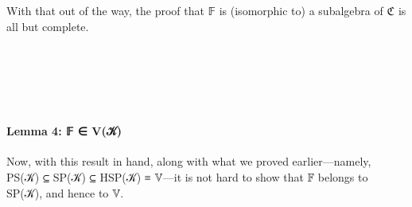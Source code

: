 With that out of the way, the proof that 𝔽 is (isomorphic to) a
subalgebra of ℭ is all but complete.

\begin{code}%
\>[0][@{}l@{\AgdaIndent{1}}]%
\>[1]\AgdaSpace{}%
\AgdaSymbol{:}\AgdaSpace{}%
\AgdaSpace{}%
\AgdaSpace{}%
\AgdaSpace{}%
\AgdaSpace{}%
\AgdaSpace{}%
\AgdaSpace{}%
\AgdaSpace{}%
\<%
\\
%
\>[1]\AgdaSpace{}%
\AgdaSpace{}%
\AgdaSymbol{=}\AgdaSpace{}%
\AgdaSpace{}%
\AgdaSpace{}%
\AgdaSpace{}%
\AgdaOperator{\AgdaInductiveConstructor{,}}\AgdaSpace{}%
\AgdaSymbol{(}\AgdaSpace{}%
\AgdaOperator{\AgdaInductiveConstructor{,}}\AgdaSpace{}%
\AgdaSpace{}%
\AgdaSpace{}%
\AgdaSymbol{)}\<%
\\
\>[1][@{}l@{\AgdaIndent{0}}]%
\>[2]\<%
\\
\>[2][@{}l@{\AgdaIndent{0}}]%
\>[3]\AgdaSpace{}%
\AgdaSymbol{:}\AgdaSpace{}%
\AgdaSpace{}%
\AgdaSpace{}%
\AgdaSpace{}%
\<%
\\
%
\>[3]\AgdaSpace{}%
\AgdaSymbol{=}\AgdaSpace{}%
\AgdaSpace{}%
\AgdaSpace{}%
\AgdaSpace{}%
\AgdaSpace{}%
\AgdaSpace{}%
\<%
\end{code}

\paragraph{Lemma 4: 𝔽 ∈ V(𝒦)}\label{lemma-4-ux1d53d-vux1d4a6}

Now, with this result in hand, along with what we proved
earlier---namely, PS(𝒦) ⊆ SP(𝒦) ⊆ HSP(𝒦) ≡ 𝕍---it is not hard to show
that 𝔽 belongs to SP(𝒦), and hence to 𝕍.

